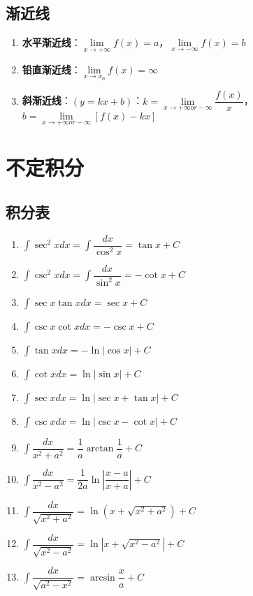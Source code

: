 \documentclass[12pt,a4paper,UTF8]{book}
\begin{document}
\subsection{渐近线}
\begin{enumerate}
\item \textbf{水平渐近线}：$\lim\limits_{x\to+\infty}f\left(x\right)=a$，$\lim\limits_{x\to-\infty}f\left(x\right)=b$
\item \textbf{铅直渐近线}：$\lim\limits_{x\to x_0}f\left(x\right)=\infty$
\item \textbf{斜渐近线}：$\left(y=kx+b\right)$：$k=\lim\limits_{x\to+\infty or-\infty}\dfrac{f\left(x\right)}{x}$，$b=\lim\limits_{x\to+\infty or-\infty}\left[f\left(x\right)-kx\right]$
\end{enumerate}


\section{不定积分}
\subsection{积分表}
\begin{enumerate}
\item $\int{\sec^2xdx}=\int\dfrac{dx}{\cos^2x}=\tan x+C$
\item $\int{\csc^2xdx}=\int\dfrac{dx}{\sin^2x}=-\cot x+C$
\item $\int{\sec x\tan xdx}=\sec x+C$
\item $\int{\csc x\cot xdx}=-\csc x+C$
\item $\int{\tan xdx}=-\ln\left|\cos x\right|+C$
\item $\int{\cot xdx}=\ln\left|\sin x\right|+C$
\item $\int{\sec xdx}=\ln\left|\sec x+\tan x\right|+C$
\item $\int{\csc xdx}=\ln\left|\csc x-\cot x\right|+C$
\item $\int{\dfrac{dx}{x^2+a^2}}=\dfrac{1}{a}\arctan\dfrac{1}{a}+C$
\item $\int{\dfrac{dx}{x^2-a^2}}=\dfrac{1}{2a}\ln\left|\dfrac{x-a}{x+a}\right|+C$
\item $\int{\dfrac{dx}{\sqrt{x^2+a^2}}}=\ln\left(x+\sqrt{x^2+a^2}\right)+C$
\item $\int{\dfrac{dx}{\sqrt{x^2-a^2}}}=\ln\left|x+\sqrt{x^2-a^2}\right|+C$
\item $\int{\dfrac{dx}{\sqrt{a^2-x^2}}}=\arcsin\dfrac{x}{a}+C$
\end{enumerate}
\end{document}
